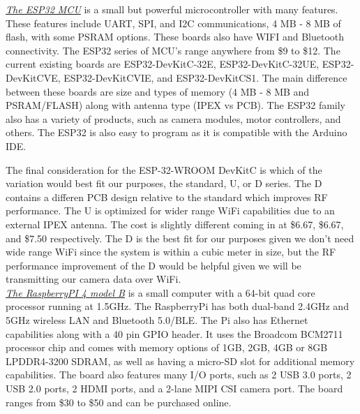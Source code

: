 \noindent \underline{\textit{The ESP32 MCU}} is a small but powerful microcontroller with many features. These features include UART, SPI, and I2C communications, 4 MB - 8 MB of flash, with some PSRAM options. These boards also have WIFI and Bluetooth connectivity. The ESP32 series of MCU's range anywhere from \$9 to \$12. The current existing boards are ESP32-DevKitC-32E, ESP32-DevKitC-32UE, ESP32-DevKitCVE, ESP32-DevKitCVIE, and ESP32-DevKitCS1. The main difference between these boards are size and types of memory (4 MB - 8 MB and PSRAM/FLASH) along with antenna type (IPEX vs PCB). The ESP32 family also has a variety of products, such as camera modules, motor controllers, and others. The ESP32 is also easy to program as it is compatible with the Arduino IDE. \newline

\noindent The final consideration for the ESP-32-WROOM DevKitC is which of the variation would best fit our purposes, the standard, U, or D series. The D contains a differen PCB design relative to the standard which improves RF performance. The U is optimized for wider range WiFi capabilities due to an external IPEX antenna. The cost is slightly different coming in at \$6.67, \$6.67, and \$7.50 respectively. The D is the best fit for our purposes given we don't need wide range WiFi since the system is within a cubic meter in size, but the RF performance improvement of the D would be helpful given we will be transmitting our camera data over WiFi. \\

\noindent \underline{\textit{The RaspberryPI 4 model B}} is a small computer with a 64-bit quad core processor running at 1.5GHz. The RaspberryPi has both dual-band 2.4GHz and 5GHz wireless LAN and Bluetooth 5.0/BLE. The Pi also has Ethernet capabilities along with a 40 pin GPIO header. It uses the Broadcom BCM2711 processor chip and comes with memory options of 1GB, 2GB, 4GB or 8GB LPDDR4-3200 SDRAM, as well as having a micro-SD slot for additional memory capabilities. The board also features many I/O ports, such as 2 USB 3.0 ports, 2 USB 2.0 ports, 2 HDMI ports, and a 2-lane MIPI CSI camera port. The board ranges from \$30 to \$50 and can be purchased online. \\

